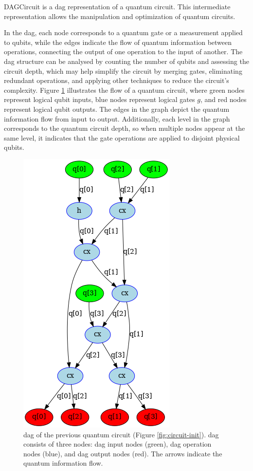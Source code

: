 \begin{definition}
    DAGCircuit \cite{ibmquantum_dagcircuit} is a \acrfull{dag} representation of a quantum circuit. This intermediate representation allows the manipulation and optimization of quantum circuits.
\end{definition}
In the \acrshort{dag}, each node corresponds to a quantum gate or a measurement applied to qubits, while the edges indicate the flow of quantum information between operations, connecting the output of one operation to the input of another. The \acrshort{dag} structure can be analysed by counting the number of qubits and assessing the circuit depth, which may help simplify the circuit by merging gates, eliminating redundant operations, and applying other techniques to reduce the circuit's complexity. Figure \ref{fig:dag-embeded} illustrates the flow of a quantum circuit, where green nodes represent logical qubit inputs, blue nodes represent logical gates $g$, and red nodes represent logical qubit outputs. The edges in the graph depict the quantum information flow from input to output. Additionally, each level in the graph corresponds to the quantum circuit depth, so when multiple nodes appear at the same level, it indicates that the gate operations are applied to disjoint physical qubits.
\begin{figure}[h]
    \centering
    \includegraphics[width=0.32\linewidth]{image/dag_embeded.png}
    \caption{\acrfull{dag} of the previous quantum circuit (Figure \ref{fig:circuit-init}). \acrshort{dag} consists of three nodes: \acrshort{dag} input nodes (green), \acrshort{dag} operation nodes (blue), and \acrshort{dag} output nodes (red). The arrows indicate the quantum information flow.}
    \label{fig:dag-embeded}
\end{figure}

